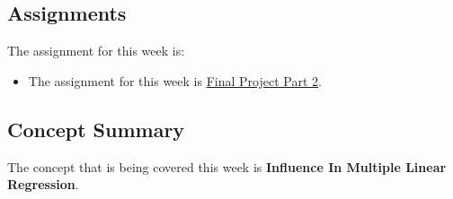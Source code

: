 \subsection{Assignments}

The assignment for this week is:

\begin{itemize}
    \item The assignment for this week is \href{https://github.com/QuantumCompiler/CU/tree/main/CSPB%203022%20-%20Introduction%20To%20Data%20Science%20With%20Probability%20And%20Statistics/CSPB%203022%20-%20Final%20Project/CSPB%203022%20-%20Final%20Project%20Part%202}{Final Project Part 2}. 
\end{itemize}

\subsection{Concept Summary}

The concept that is being covered this week is \textbf{Influence In Multiple Linear Regression}.

